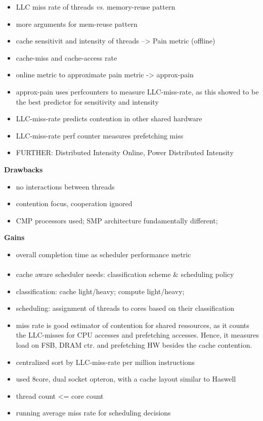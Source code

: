 \begin{itemize}
  \item LLC miss rate of threads \textit{vs.} memory-reuse pattern
  \item more arguments for mem-reuse pattern
  \item cache sensitivit and intensity of threads --> Pain metric (offline)
  \item cache-miss and cache-access rate
  \item online metric to approximate pain metric -> approx-pain
  \item approx-pain uses perfcounters to measure LLC-miss-rate, as this showed
    to be the best predictor for sensitivity and intensity
  \item LLC-miss-rate predicts contention in other shared hardware
  \item LLC-miss-rate perf counter measures prefetching miss
  \item FURTHER: Distributed Intensity Online, Power Distributed Intensity
\end{itemize}

\textbf{Drawbacks}
\begin{itemize}
  \item no interactions between threads
  \item contention focus, cooperation ignored
  \item CMP processors used; SMP architecture fundamentally different;
\end{itemize}

\textbf{Gains}
\begin{itemize}
  \item overall completion time as scheduler performance metric
\end{itemize}

\paragraph{ \cite{zhuravlev_addressing_2010} }
\begin{itemize}
  \item cache aware scheduler needs: classification scheme \& scheduling policy
  \item classification: cache light/heavy; compute light/heavy;
  \item scheduling: assignment of threads to cores based on their classification
  \item miss rate is good estimator of contention for shared ressources, as it
    counts the LLC-misses for CPU accesses and prefetching accesses. Hence, it
    measures load on FSB, DRAM ctr. and prefetching HW besides the cache
    contention.
  \item centralized sort by LLC-miss-rate per million instructions
  \item used 8core, dual socket opteron, with a cache layout similar to Haswell
  \item thread count <= core count
  \item running average miss rate for scheduling decisions
\end{itemize}

